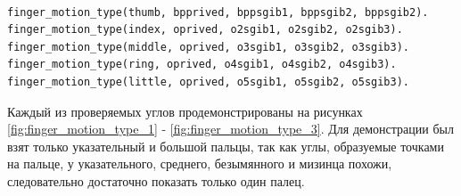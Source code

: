 \begin{lstlisting}[caption=Знания о типах проверок каждого пальца, label=facts:fingermotiontype]
%finger_motion_type(FingerType, AbductionType, Flexion1, Flexion2, Flexion3).

finger_motion_type(thumb, bpprived, bppsgib1, bppsgib2, bppsgib2).
finger_motion_type(index, oprived, o2sgib1, o2sgib2, o2sgib3).
finger_motion_type(middle, oprived, o3sgib1, o3sgib2, o3sgib3).
finger_motion_type(ring, oprived, o4sgib1, o4sgib2, o4sgib3).
finger_motion_type(little, oprived, o5sgib1, o5sgib2, o5sgib3).
\end{lstlisting}

\newpage

\hspace{0.6cm} Каждый из проверяемых углов продемонстрированы на рисунках \ref{fig:finger_motion_type_1} - \ref{fig:finger_motion_type_3}. Для демонстрации был взят только указательный и большой пальцы, так как углы, образуемые точками на пальце, у указательного, среднего, безымянного и мизинца похожи, следовательно достаточно показать только один палец.

